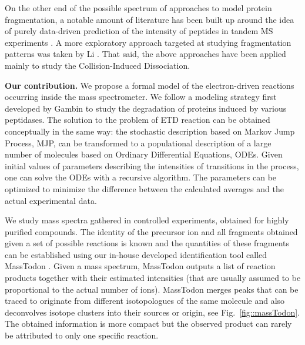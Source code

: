 \documentclass{llncs}
\begin{document}
On the other end of the possible spectrum of approaches to model protein fragmentation, a notable amount of literature has been built up around the idea of purely data-driven prediction of the intensity of peptides in tandem MS experiments \cite{Elias2004-fr,Arnold2006-wn,Degroeve2013-ej}. A more exploratory approach targeted at studying fragmentation patterns was taken by Li \cite{Li2011-mq}. That said, the above approaches have been applied mainly to study the Collision-Induced Dissociation.

\textbf{Our contribution.}
We propose a formal model of the electron-driven reactions occurring inside the mass spectrometer. We follow a modeling strategy first developed by Gambin \cite{Gambin2010} to study the degradation of proteins induced by various peptidases.
The solution to the problem of ETD reaction can be obtained conceptually in the same way: the stochastic description based on Markov Jump Process, MJP, can be transformed to a populational description of a large number of molecules based on Ordinary Differential Equations, ODEs.
Given initial values of parameters describing the intensities of transitions in the process, one can solve the ODEs with a recursive algorithm. The parameters can be optimized to minimize the difference between the calculated averages and the actual experimental data.

We study mass spectra gathered in controlled experiments, obtained for highly purified compounds. The identity of the precursor ion and all fragments obtained given a set of possible reactions is known and the quantities of these fragments can be established using our in-house developed identification tool called {\sc MassTodon} \cite{Lermyte2015-lm,Lermyte2017-zt}. Given a mass spectrum, {\sc MassTodon} outputs a list of reaction products together with their estimated intensities (that are usually assumed to be proportional to the actual number of ions). {\sc MassTodon} merges peaks that can be traced to originate from different isotopologues of the same molecule and also deconvolves isotope clusters into their sources or origin, see Fig.~\ref{fig::massTodon}.
The obtained information is more compact but the observed product can rarely be attributed to only one specific reaction.
\end{document}
